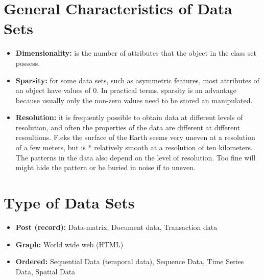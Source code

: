 	\section{General Characteristics of Data Sets}
			\begin{itemize}
				\item {\bf Dimensionality:} is the number of attributes that the object in the 
				class set possess.
				\item {\bf Sparsity:} for some data sets, such as asymmetric features, most
				attributes of an object have values of 0. In practical terms, sparsity is an advantage
				because usually only the non-zero values need to be stored an manipulated. 
				\item {\bf Resolution:} it is frequently possible to obtain data at different levels of
				resolution, and often the properties of the data are different at different resoultions.
				F.eks the surface of the Earth seems very uneven at a resolution of a few meters, but is *
				relatively smooth at a resolution of ten kilometers. The patterns in the data also depend
				on the level of resolution. Too fine will might hide the pattern or be buried in noise if
				to uneven. 
			\end{itemize}
	
	\section{Type of Data Sets}
		\begin{itemize}
			\item {\bf Post (record):} Data-matrix, Document data, Transaction data 
			\item {\bf Graph:} World wide web (HTML)
			\item {\bf Ordered:} Sequential Data (temporal data), Sequence Data, Time Series Data,
			Spatial Data
		\end{itemize}

		\clearpage
